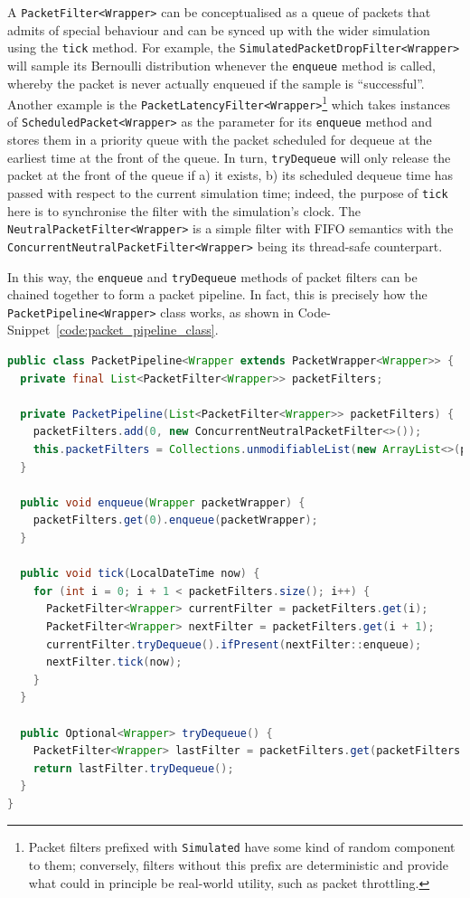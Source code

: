 A \texttt{PacketFilter<Wrapper>} can be conceptualised as a queue of packets that admits of special behaviour and can
be synced up with the wider simulation using the \texttt{tick} method. For example, the
\texttt{SimulatedPacketDropFilter<Wrapper>} will sample its Bernoulli distribution whenever the \texttt{enqueue}
method is called, whereby the packet is never actually enqueued if the sample is ``successful''. Another example is
the \texttt{PacketLatencyFilter<Wrapper>}\footnote{Packet filters prefixed with \texttt{Simulated} have some kind of
random component to them; conversely, filters without this prefix are deterministic and provide what could in
principle be real-world utility, such as packet throttling.} which takes instances of
\texttt{ScheduledPacket<Wrapper>} as the parameter for its \texttt{enqueue} method and stores them in a priority
queue with the packet scheduled for dequeue at the earliest time at the front of the queue. In turn,
\texttt{tryDequeue} will only release the packet at the front of the queue if a) it exists, b) its scheduled dequeue
time has passed with respect to the current simulation time; indeed, the purpose of \texttt{tick} here is to
synchronise the filter with the simulation's clock. The \texttt{NeutralPacketFilter<Wrapper>} is a simple filter with
FIFO semantics with the \texttt{ConcurrentNeutralPacketFilter<Wrapper>} being its thread-safe counterpart.

In this way, the \texttt{enqueue} and \texttt{tryDequeue} methods of packet filters can be chained together to form a
packet pipeline. In fact, this is precisely how the \texttt{PacketPipeline<Wrapper>} class works, as shown in
Code-Snippet~\ref{code:packet_pipeline_class}.
\begin{lstlisting}[language=Java,caption={A cut-down version of the \texttt{PacketPipeline<Wrapper>} class.},
    label={code:packet_pipeline_class},captionpos=b]
public class PacketPipeline<Wrapper extends PacketWrapper<Wrapper>> {
  private final List<PacketFilter<Wrapper>> packetFilters;

  private PacketPipeline(List<PacketFilter<Wrapper>> packetFilters) {
    packetFilters.add(0, new ConcurrentNeutralPacketFilter<>());
    this.packetFilters = Collections.unmodifiableList(new ArrayList<>(packetFilters));
  }

  public void enqueue(Wrapper packetWrapper) {
    packetFilters.get(0).enqueue(packetWrapper);
  }

  public void tick(LocalDateTime now) {
    for (int i = 0; i + 1 < packetFilters.size(); i++) {
      PacketFilter<Wrapper> currentFilter = packetFilters.get(i);
      PacketFilter<Wrapper> nextFilter = packetFilters.get(i + 1);
      currentFilter.tryDequeue().ifPresent(nextFilter::enqueue);
      nextFilter.tick(now);
    }
  }

  public Optional<Wrapper> tryDequeue() {
    PacketFilter<Wrapper> lastFilter = packetFilters.get(packetFilters.size() - 1);
    return lastFilter.tryDequeue();
  }
}
\end{lstlisting}

